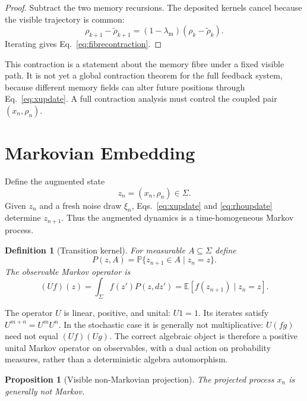 \documentclass[preprint,amsmath,amssymb,aps,prd,nofootinbib,floatfix]{revtex4-2}
\newtheorem{definition}{Definition}
\newtheorem{proposition}{Proposition}
\begin{document}
\begin{proof}
Subtract the two memory recursions. The deposited kernels cancel because the
visible trajectory is common:
\[
\rho_{k+1}-\tilde\rho_{k+1}
=(1-\lambda_{\mathrm m})(\rho_k-\tilde\rho_k).
\]
Iterating gives Eq.~\eqref{eq:fibrecontraction}.
\end{proof}

This contraction is a statement about the memory fibre under a fixed visible
path. It is not yet a global contraction theorem for the full feedback system,
because different memory fields can alter future positions through
Eq.~\eqref{eq:xupdate}. A full contraction analysis must control the coupled
pair $(x_n,\rho_n)$.

\section{Markovian Embedding}
\label{sec:markov}

Define the augmented state
\begin{equation}
z_n=(x_n,\rho_n)\in\Sigma.
\end{equation}
Given $z_n$ and a fresh noise draw $\xi_n$, Eqs.~\eqref{eq:xupdate} and
\eqref{eq:rhoupdate} determine $z_{n+1}$. Thus the augmented dynamics is a
time-homogeneous Markov process.

\begin{definition}[Transition kernel]
For measurable $A\subseteq\Sigma$ define
\begin{equation}
P(z,A)=\mathbb{P}\{z_{n+1}\in A\mid z_n=z\}.
\end{equation}
The observable Markov operator is
\begin{equation}
(Uf)(z)=\int_\Sigma f(z')P(z,dz')
=\mathbb{E}[f(z_{n+1})\mid z_n=z].
\label{eq:operator}
\end{equation}
\end{definition}

The operator $U$ is linear, positive, and unital: $U1=1$. Its iterates satisfy
$U^{m+n}=U^mU^n$. In the stochastic case it is generally not multiplicative:
$U(fg)$ need not equal $(Uf)(Ug)$. The correct algebraic object is therefore
a positive unital Markov operator on observables, with a dual action on
probability measures, rather than a deterministic algebra automorphism.

\begin{proposition}[Visible non-Markovian projection]
The projected process $x_n$ is generally not Markov.
\end{proposition}
\end{document}
